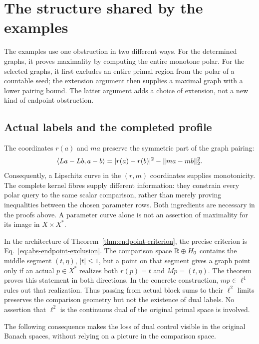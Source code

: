 \section{The structure shared by the examples}
\label{sec:structure}
The examples use one obstruction in two different ways. For the determined
graphs, it proves maximality by computing the entire monotone polar. For
the selected graphs, it first excludes an entire primal region from the
polar of a countable seed; the extension argument then supplies a maximal
graph with a lower pairing bound. The latter argument adds a choice of
extension, not a new kind of endpoint obstruction.

\subsection{Actual labels and the completed profile}
The coordinates $r(a)$ and $ma$ preserve the symmetric part of the graph
pairing:
\[
\langle La-Lb,a-b\rangle=|r(a)-r(b)|^2-\|ma-mb\|_2^2.
\]
Consequently, a Lipschitz curve in the $(r,m)$ coordinates supplies
monotonicity. The complete kernel fibres supply different information:
they constrain every polar query to the same scalar comparison, rather
than merely proving inequalities between the chosen parameter rows.
Both ingredients are necessary in the proofs above. A parameter curve
alone is not an assertion of maximality for its image in $X\times X^*$.

In the architecture of Theorem~\ref{thm:endpoint-criterion}, the precise
criterion is Eq.~\eqref{eq:abs-endpoint-exclusion}. The comparison space
$\mathbb R\oplus H_0$ contains the middle segment $(t,\eta)$, $|t|\le1$,
but a point on that segment gives a graph point only if an actual
$p\in X^*$ realizes both $r(p)=t$ and $Mp=(t,\eta)$. The theorem proves
this statement in both directions. In the concrete construction,
$mp\in\ell^1$ rules out that realization. Thus passing from actual
block sums to their $\ell^2$ limits preserves the comparison geometry
but not the existence of dual labels. No assertion that $\ell^2$ is
the continuous dual of the original primal space is involved.

The following consequence makes the loss of dual control visible in
the original Banach spaces, without relying on a picture in the
comparison space.

